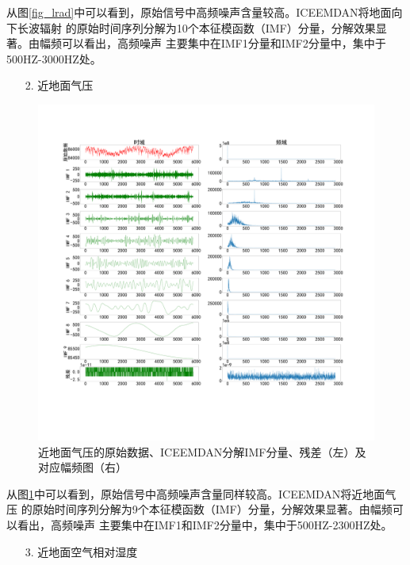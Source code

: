 \documentclass[AutoFakeBold]{LZUThesis}
\begin{document}
从图\ref{fig_lrad}中可以看到，原始信号中高频噪声含量较高。ICEEMDAN将地面向下长波辐射
的原始时间序列分解为10个本征模函数（IMF）分量，分解效果显著。由幅频可以看出，高频噪声
主要集中在IMF1分量和IMF2分量中，集中于500HZ-3000HZ处。

\begin{itemize}
    \item[2. ] 近地面气压
\end{itemize}

\begin{figure}[H]
	\centering
    \includegraphics[width=1\textwidth]{figures/pres.pdf}
    \caption{近地面气压的原始数据、ICEEMDAN分解IMF分量、残差（左）及对应幅频图（右）}
    \label{fig_pres}
\end{figure}

从图\ref{fig_pres}中可以看到，原始信号中高频噪声含量同样较高。ICEEMDAN将近地面气压
的原始时间序列分解为9个本征模函数（IMF）分量，分解效果显著。由幅频可以看出，高频噪声
主要集中在IMF1和IMF2分量中，集中于500HZ-2300HZ处。

\begin{itemize}
    \item[3. ] 近地面空气相对湿度
\end{itemize}
\end{document}
